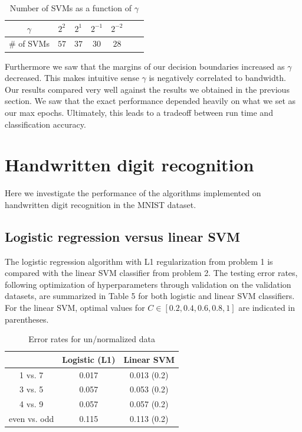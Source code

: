 \documentclass{article}
\begin{document}
\begin{table}
  \begin{center}
    \begin{tabular}{ | c | c | c | c | c | c | c |}
      \hline
       $\gamma$& $2^2$       & $2^{1}$&  $2^{-1}$& $2^{-2}$\\ \hline
       # of SVMs & $57$     & $37     $&  $30$     & $28$ \\ \hline

    \end{tabular}
  \end{center}
  \caption{Number of SVMs as a function of $\gamma$}
\end{table}
Furthermore we saw that the margins of our decision boundaries increased as $\gamma$ decreased. This makes intuitive sense $\gamma$ is negatively correlated to bandwidth. Our results compared very well against the results we obtained in the previous section. We saw that the exact performance depended heavily on what we set as our max epochs. Ultimately, this leads to a tradeoff between run time and classification accuracy. 

\section{Handwritten digit recognition}
Here we investigate the performance of the algorithms implemented on handwritten digit recognition in the MNIST dataset.

\subsection{Logistic regression versus linear SVM}

The logistic regression algorithm with L1 regularization from problem 1 is compared with the linear SVM classifier from problem 2. The testing error rates, following optimization of hyperparameters through validation on the validation datasets, are summarized in Table 5 for both logistic and linear SVM classifiers. For the linear SVM, optimal values for $C \in [0.2, 0.4, 0.6, 0.8, 1]$ are indicated in parentheses. \\

\begin{table}
  \begin{center}
    \begin{tabular}{ | c | c | c | }
      \hline
                     & Logistic (L1)    & Linear SVM       \\ \hline
      1 vs. 7        & 0.017            & 0.013 (0.2)      \\ \hline
      3 vs. 5        & 0.057            & 0.053 (0.2)      \\ \hline
      4 vs. 9        & 0.057            & 0.057 (0.2)      \\ \hline
      even vs. odd   & 0.115            & 0.113 (0.2)      \\ \hline
    \end{tabular}
  \end{center}
  \caption{Error rates for un/normalized data}
\end{table}
\end{document}
